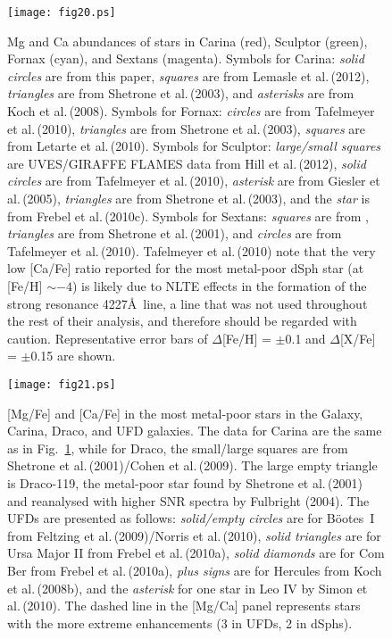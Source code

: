 \documentclass{emulateapj}
\newcommand\etal{{\rm et al.\,}}
\begin{document}
\begin{figure}[t]
\texttt{[image: fig20.ps]}
\caption{
Mg and Ca abundances of stars in Carina (red),
Sculptor (green), Fornax (cyan), and Sextans (magenta).   
%
Symbols for Carina: 
{\it solid circles} are from this paper, 
{\it squares} are from Lemasle \etal (2012),
{\it triangles} are from Shetrone \etal (2003), 
and {\it asterisks} are from Koch \etal (2008). 
%
Symbols for Fornax: 
{\it circles} are from Tafelmeyer \etal (2010), 
{\it triangles} are from Shetrone \etal (2003), 
{\it squares} are from Letarte \etal (2010).
%
Symbols for Sculptor: 
{\it large/small squares} are UVES/GIRAFFE FLAMES data from Hill \etal (2012), 
{\it solid circles} are from Tafelmeyer \etal (2010),
{\it asterisk} are from Giesler \etal (2005), 
{\it triangles} are from Shetrone \etal (2003), 
and the {\it star} is from Frebel \etal (2010c). 
%
Symbols for Sextans:
{\it squares} are from \citet{Aoki09},
 {\it triangles } are from Shetrone \etal (2001),
and {\it circles} are from Tafelmeyer \etal (2010).
%
Tafelmeyer \etal (2010) note that the very low [Ca/Fe]
ratio reported for the most metal-poor dSph star 
(at [Fe/H] $\sim -4$) is likely due to NLTE effects 
in the formation of the strong resonance  4227\AA\
line, a line that was not used throughout the rest of 
their analysis, and therefore should be regarded with
caution. 
%
Representative error bars of $\Delta$[Fe/H] = $\pm$0.1 and
$\Delta$[X/Fe] = $\pm$0.15 are shown.  \\
}
\label{dmgca2012}
\end{figure}




\begin{figure}[t]
\texttt{[image: fig21.ps]}
\caption{[Mg/Fe] and [Ca/Fe] in the most metal-poor stars in
the Galaxy, Carina, Draco, and UFD galaxies.
The data for Carina are the same as in Fig.~\ref{dmgca2012}, 
while for Draco, the small/large squares are from 
Shetrone \etal (2001)/Cohen \etal (2009). 
The large empty triangle is Draco-119, 
the metal-poor star found by Shetrone \etal (2001) 
and reanalysed with higher SNR spectra by Fulbright (2004). 
%
The UFDs are presented as follows:
{\it solid/empty circles} are for B\"ootes~I from 
Feltzing \etal (2009)/Norris \etal (2010), 
{\it solid triangles} are for Ursa Major II from Frebel \etal (2010a),
{\it solid diamonds} are for Com Ber from Frebel \etal (2010a),
{\it plus signs} are for Hercules from Koch \etal (2008b),
and the {\it asterisk} for one star in Leo IV by Simon \etal (2010).
%
The dashed line in the [Mg/Ca] panel represents stars with the
more extreme enhancements (3 in UFDs, 2 in dSphs).  
\\
}
\label{dufdmgca2012}
\end{figure}
\end{document}

